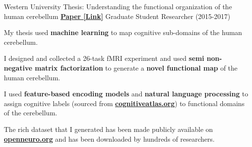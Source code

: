 \begin{cventries}
  \cventry
    {Western University} %
    {Thesis: Understanding the functional organization of the human cerebellum}
    {\href{http://ivrylab.berkeley.edu/uploads/4/1/1/5/41152143/functional_boundaries_in_the_human_cerebellum.pdf}{\textbf{Paper [Link]}}}
    {Graduate Student Researcher (2015-2017)} %
    {
      \begin{cvitems} %
        \item {My thesis used \textbf{machine learning} to map cognitive sub-domains of the human cerebellum.}
      	\item {I designed and collected a 26-task fMRI experiment and used \textbf{semi non-negative matrix factorization} to generate a \textbf{novel functional map} of the human cerebellum.}
      	\item {I used \textbf{feature-based encoding models} and \textbf{natural language processing} to assign cognitive labels (sourced from {\href{https://cognitiveatlas.org/}{\textbf{cognitiveatlas.org}}}) to functional domains of the cerebellum.}
      	\item {The rich dataset that I generated has been made publicly available on {\href{https://openneuro.org/datasets/ds002105/versions/1.1.0}{\textbf{openneuro.org}}} and has been downloaded by hundreds of researchers.}
      \end{cvitems}
    }

\end{cventries}
